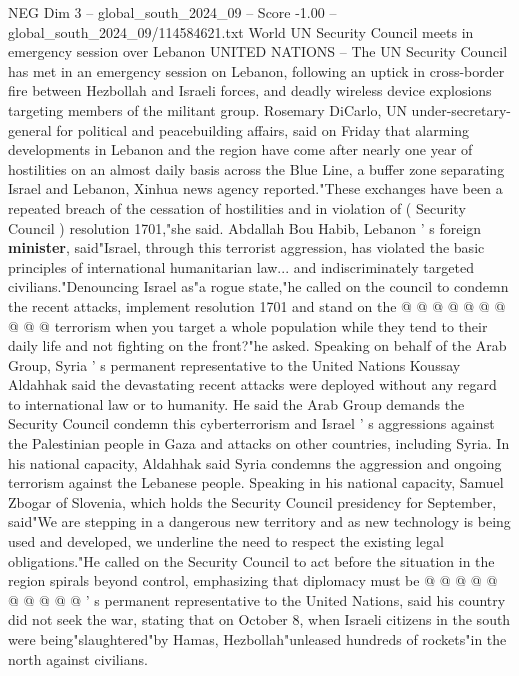 \begin{textsample}{NEG Dim 3 – global\_south\_2024\_09 – Score -1.00 – global\_south\_2024\_09/114584621.txt}  \label{ex:f3_neg_129}
World UN Security Council meets in emergency session over Lebanon UNITED NATIONS -- The UN Security Council has met in an emergency session on Lebanon, following an uptick in cross-border fire between Hezbollah and Israeli forces, and deadly wireless device explosions targeting members of the militant group.
Rosemary DiCarlo, UN under-secretary-general for political and peacebuilding affairs, said on Friday that alarming developments in Lebanon and the region have come after nearly one year of hostilities on an almost daily basis across the Blue Line, a buffer zone separating Israel and Lebanon, Xinhua news agency reported."These exchanges have been a repeated breach of the cessation of hostilities and in violation of ( Security Council ) resolution 1701,"she said.
Abdallah Bou Habib, Lebanon ' s foreign \textbf{minister}, said"Israel, through this terrorist aggression, has violated the basic principles of international humanitarian law... and indiscriminately targeted civilians."Denouncing Israel as"a rogue state,"he called on the council to condemn the recent attacks, implement resolution 1701 and stand on the @ @ @ @ @ @ @ @ @ @ terrorism when you target a whole population while they tend to their daily life and not fighting on the front?"he asked.
Speaking on behalf of the Arab Group, Syria ' s permanent representative to the United Nations Koussay Aldahhak said the devastating recent attacks were deployed without any regard to international law or to humanity.
He said the Arab Group demands the Security Council condemn this cyberterrorism and Israel ' s aggressions against the Palestinian people in Gaza and attacks on other countries, including Syria.
In his national capacity, Aldahhak said Syria condemns the aggression and ongoing terrorism against the Lebanese people.
Speaking in his national capacity, Samuel Zbogar of Slovenia, which holds the Security Council presidency for September, said"We are stepping in a dangerous new territory and as new technology is being used and developed, we underline the need to respect the existing legal obligations."He called on the Security Council to act before the situation in the region spirals beyond control, emphasizing that diplomacy must be @ @ @ @ @ @ @ @ @ @ ' s permanent representative to the United Nations, said his country did not seek the war, stating that on October 8, when Israeli citizens in the south were being"slaughtered"by Hamas, Hezbollah"unleased hundreds of rockets"in the north against civilians.

\end{textsample}
